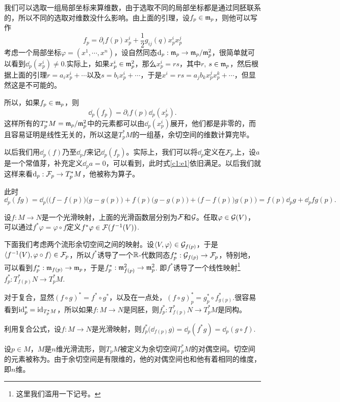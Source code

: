 我们可以选取一组局部坐标来算维数，由于选取不同的局部坐标都是通过同胚联系的，所以不同的选取对维数没什么影响。由上面的引理，设$f_p\in \mathfrak{m}_p$，则他可以写作
\[
	f_p=\partial_i f(p)x^i_p+\frac{1}{2}g_{ij}(q)x^i_px^j_p
\]
考虑一个局部坐标$\varphi=(x^1,\cdots,x^n)$，设自然同态$\mathrm{d}_p:\mathfrak{m}_p\to \mathfrak{m}_p/\mathfrak{m}_p^2$，很简单就可以看到$\dd_p(x^i_p)\neq 0$.实际上，如果$x^i_p\in \mathfrak{m}_p^2$，那么$x^i_p=rs$，其中$r$, $s\in \mathfrak{m}_p$，然后根据上面的引理$r=a_ix^i_p+\cdots$以及$s=b_ix^i_p+\cdots$，于是$x^i=rs=a_jb_kx^j_px^k_p+\cdots$，但显然这是不可能的。

所以，如果$f_p\in \mathfrak{m}_p$，则
\begin{equation}
\label{c1:e1}
	\dd_p(f_p)=\partial_i f(p)\dd_p(x^i_p).
\end{equation}
这样所有的$T_p^*M=\mathfrak{m}_p/\mathfrak{m}_p^2$中的元素都可以由$\dd_p(x^i_p)$展开，他们都是非零的，而且容易证明是线性无关的，所以这是$T_p^*M$的一组基，余切空间的维数计算完毕。

以后我们用$\dd_p(f)$乃至$\dd_pf$来记$\dd_p(f_p)$。实际上，我们可以将$\dd_p$定义在$\mathcal{F}_p$上，设$a$是一个常值芽，补充定义$\dd_pa=0$，可以看到，此时式\eqref{c1:e1}依旧满足。以后我们就这样来看$\mathrm{d}_p:\mathcal{F}_p\to T_p^*M$，他被称为算子。

此时
\[
\dd_p (fg)=\dd_p\bigl(\bigl(f-f(p)\bigr)\bigl(g-g(p)\bigr)+f(p)\bigl(g-g(p)\bigr)+\bigl(f-f(p)\bigr)g(p)\bigr)=f(p)\dd_pg+\dd_pf g(p).
\]

\para 设$f:M\to N$是一个光滑映射，上面的光滑函数层分别为$\mathcal{F}$和$\mathcal{G}$。任取$\varphi\in \mathcal{G}(V)$，可以通过$f^*\varphi=\varphi\circ f$定义$f^*\varphi\in \mathcal{F}(f^{-1}(V))$.

下面我们考虑两个流形余切空间之间的映射。设$\langle V,\varphi\rangle\in \mathcal{G}_{f(p)}$，于是$\langle f^{-1}(V),\varphi\circ f\rangle\in \mathcal{F}_p$，所以$f^*$诱导了一个$\mathbb{R}$-代数同态$f^*_p:\mathcal{G}_{f(p)}\to \mathcal{F}_p$，特别地，可以看到$f^*_p:\mathfrak{m}_{f(p)}\to \mathfrak{m}_{p}$，于是$f^*_p:\mathfrak{m}^2_{f(p)}\to \mathfrak{m}^2_{p}$. 即$f^*$诱导了一个线性映射\footnote{这里我们滥用一下记号。}$f^*_p:T_{f(p)}^*N\to T_p^*M$.

对于复合，显然$(f\circ g)^*=f^*\circ g^*$，以及在一点处，$(f\circ g)^*_p=g^*_p\circ f^*_{g(p)}$.很容易看到$\operatorname{id}^*_p=\operatorname{id}_{T_p^*M}$，所以如果$f:M\to N$是同胚，则$f_p^*:T_{f(p)}^*N\to T_p^*M$是同构。

\para \label{f*d=df*}利用复合公式，设$f:M\to N$是光滑映射，则$f^*_p\bigl(\dd_{f(p)}g\bigr)=\dd_{p}(f^*g)=\dd_p(g\circ f)$.

\para 设$p\in M$，$M$是$n$维光滑流形，则$T_pM$被定义为余切空间$T_p^*M$的对偶空间。切空间的元素被称为。由于余切空间是有限维的，他的对偶空间也和他有着相同的维度，即$n$维。

